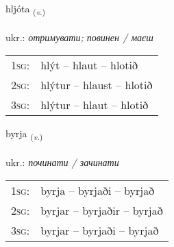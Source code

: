 \documentclass[frontgrid, backgrid]{flacards}\usepackage[]{graphicx}\usepackage[]{xcolor}
\begin{document}
\renewcommand{\flhead}{\vskip5pt \fboxsep=0pt {\small\bfseries\footnotesize Sagnorð | дієслово}}
\renewcommand{\fcfoot}{\vskip5pt \fboxsep=0pt \hspace{2pt}{\small\bfseries\footnotesize 1K}}

\renewcommand{\blhead}{\vskip5pt {\small\bfseries\footnotesize Sagnorð | дієслово }}
\renewcommand{\bcfoot}{\vskip5pt \hspace{2pt}{\small\bfseries\footnotesize 1K}}


{hljóta \small{\textsubscript{(\textit{v.})}} \\[1ex] %
\textphonetic{[l̥jouːta]} \\
ukr.: \emph{отримувати; повинен / маєш} \\  [2ex]
\renewcommand*{\arraystretch}{0.8}
\begin{tabular}{p{1cm}l}
\textsc{1sg}: & hlýt -- hlaut -- hlotið \\ 
\textsc{2sg}: & hlýtur -- hlaust -- hlotið \\ 
\textsc{3sg}: & hlýtur -- hlaut -- hlotið \\ 
\end{tabular}
}

\renewcommand{\flhead}{\vskip5pt \fboxsep=0pt {\small\bfseries\footnotesize Sagnorð | дієслово}}
\renewcommand{\fcfoot}{\vskip5pt \fboxsep=0pt \hspace{2pt}{\small\bfseries\footnotesize 1K}}

\renewcommand{\blhead}{\vskip5pt {\small\bfseries\footnotesize Sagnorð | дієслово }}
\renewcommand{\bcfoot}{\vskip5pt \hspace{2pt}{\small\bfseries\footnotesize 1K}}


{byrja \small{\textsubscript{(\textit{v.})}} \\[1ex] %
\textphonetic{[pɪrja]} \\
ukr.: \emph{починати / зачинати} \\  [2ex]
\renewcommand*{\arraystretch}{0.8}
\begin{tabular}{p{1cm}l}
\textsc{1sg}: & byrja -- byrjaði -- byrjað \\ 
\textsc{2sg}: & byrjar -- byrjaðir -- byrjað \\ 
\textsc{3sg}: & byrjar -- byrjaði -- byrjað \\ 
\end{tabular}
}
\end{document}
